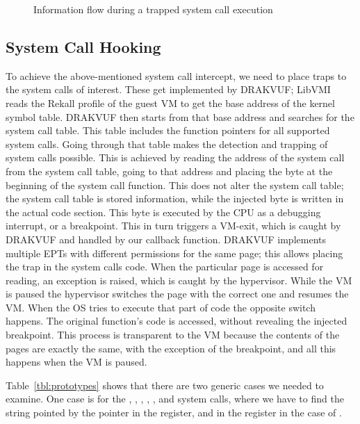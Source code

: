 \begin{table}[ht]
\begin{tabular}{ccccccc}
	\bottomrule
\end{tabular}
\end{table}



\begin{figure}[ht]
	\centering
	
	\caption{Information flow during a trapped system call execution}
	\label{fig:overview}
\end{figure}


\subsection{System Call Hooking}\label{sub:hooking}

\par To achieve the above-mentioned system call intercept, we need to place traps to the system calls of interest. These get implemented by DRAKVUF; LibVMI reads the Rekall profile of the guest \ac{VM} to get the base address of the kernel symbol table. DRAKVUF then starts from that base address and searches for the system call table. This table includes the function pointers for all supported system calls. Going through that table makes the detection and trapping of system calls possible. This is achieved by reading the address of the system call from the system call table, going to that address and placing the  byte at the beginning of the system call function. This does not alter the system call table; the system call table is stored information, while the injected byte is written in the actual code section. This byte is executed by the \ac{CPU} as a debugging interrupt, or a breakpoint. This in turn triggers a VM-exit, which is caught by DRAKVUF and handled by our callback function. DRAKVUF implements multiple \ac{EPT}s with different permissions for the same page; this allows placing the trap in the system calls code. When the particular page is accessed for reading, an exception is raised, which is caught by the hypervisor. While the \ac{VM} is paused the hypervisor switches the page with the correct one and resumes the \ac{VM}. When the \ac{OS} tries to execute that part of code the opposite switch happens. The original function's code is accessed, without revealing the injected breakpoint. This process is transparent to the \ac{VM} because the contents of the pages are exactly the same, with the exception of the breakpoint, and all this happens when the \ac{VM} is paused. 

\par Table~\ref{tbl:prototypes} shows that there are two generic cases we needed to examine. One case is for the , , , , , and  system calls, where we have to find the string pointed by the pointer in the  register, and in the  register in the case of . 

